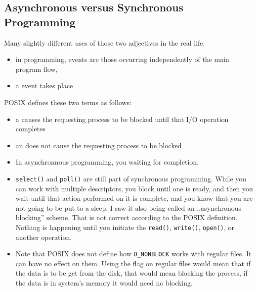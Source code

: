 
\subsection{Asynchronous versus Synchronous Programming}

Many slightly different uses of those two adjectives in the real life.

\begin{itemize}
\item in programming,  events are those occurring
independently of the main program flow, 
\item a  event takes place 
\end{itemize}

POSIX defines these two terms as follows:

\begin{itemize}
\item a  causes the requesting process to be blocked
until that I/O operation completes
\item an  does not cause the requesting process
to be blocked
\end{itemize}


\begin{itemize}
\item In asynchronnous programming, you  waiting for
completion.
\item \texttt{select()} and \texttt{poll()} are still part of synchronous
programming. While you can work with multiple descriptors, you block until one
is ready, and then you wait until that action performed on it is complete, and you
know that you are not going to be put to a sleep. I saw it also being
called an ,,asynchronous blocking'' scheme. That is not correct according to the
POSIX definition. Nothing is happening until you initiate the \texttt{read()},
\texttt{write()}, \texttt{open()}, or another operation.
\item Note that POSIX does not def{}ine how \texttt{O\_NONBLOCK} works with
regular files. It can have no effect on them. Using the flag on regular files
would mean that if the data is to be get from the disk, that would mean blocking
the process, if the data is in system's memory it would need no blocking.
\end{itemize}

